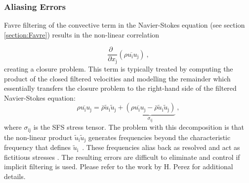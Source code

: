 \subsubsection{Aliasing Errors} \label{section:aliasing_errors}
Favre filtering of the convective term in the Navier-Stokes equation (see section \ref{section:Favre}) results in the non-linear correlation\par
\begin{equation}
 \frac{\partial \;\;}{\partial x_\mathrm{j}} (\overline{\rho u_\mathrm{i} u_\mathrm{j}}) \: ,
 \end{equation}
creating a closure problem. This term is typically treated by computing the product of the closed filtered velocities and modelling the remainder which essentially transfers the closure problem to the right-hand side of the filtered Navier-Stokes equation:
\begin{equation}
\overline{\rho u_\mathrm{i} u_\mathrm{j}} = \bar{\rho} \tilde{u}_\mathrm{i} \tilde{u}_\mathrm{j} 
+\underbrace{ (\overline{\rho u_\mathrm{i} u_\mathrm{j}} - \bar{\rho} \tilde{u}_\mathrm{i} \tilde{u}_\mathrm{j} ) }_{\sigma_\mathrm{ij}} \: ,
\end{equation}
where $\sigma_\mathrm{ij}$ is the SFS stress tensor. The problem with this decomposition is that the non-linear product $\tilde{u}_\mathrm{i} \tilde{u}_\mathrm{j}$ generates frequencies beyond the characteristic frequency that defines $\tilde{u}_\mathrm{i}$~. These frequencies alias back as resolved and act as fictitious stresses \cite{Lund:03}.
The resulting errors are difficult to eliminate and control if implicit filtering is used. Please refer to the work by H. Perez \cite{HPerez:2011} for additional details.\par

